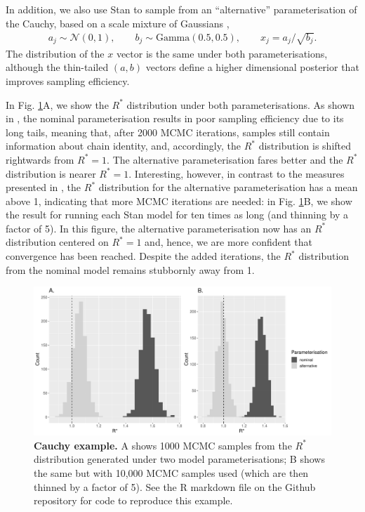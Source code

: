 \documentclass{article}
\newcommand{\N}{\mathcal{N}}
\begin{document}
In addition, we also use Stan to sample from an ``alternative'' parameterisation of the Cauchy, based on a scale mixture of Gaussians \cite{vehtari2019rank},
%
\begin{align}
a_j \sim  \N(0,1), \qquad
b_j \sim  \text{Gamma}(0.5, 0.5), \qquad
x_j =  a_j/\sqrt{b_j}.
\end{align}
%
The distribution of the $x$ vector is the same under both parameterisations, although the thin-tailed $(a,b)$ vectors define a higher dimensional posterior that improves sampling efficiency.

In Fig. \ref{fig:cauchy}A, we show the $R^*$ distribution under both parameterisations. As shown in \cite{vehtari2019rank}, the nominal parameterisation results in poor sampling efficiency due to its long tails, meaning that, after 2000 MCMC iterations, samples still contain information about chain identity, and, accordingly, the $R^*$ distribution is shifted rightwards from $R^*=1$. The alternative parameterisation fares better and the $R^*$ distribution is nearer $R^*=1$. Interesting, however, in contrast to the measures presented in \cite{vehtari2019rank}, the $R^*$ distribution for the alternative parameterisation has a mean above 1, indicating that more MCMC iterations are needed: in Fig. \ref{fig:cauchy}B, we show the result for running each Stan model for ten times as long (and thinning by a factor of 5). In this figure, the alternative parameterisation now has an $R^*$ distribution centered on $R^*=1$ and, hence, we are more confident that convergence has been reached. Despite the added iterations, the $R^*$ distribution from the nominal model remains stubbornly away from 1.

\begin{figure}[h]
	\centerline{\includegraphics[width=1.0\textwidth]{../output/cauchy.pdf}}
	\caption{\textbf{Cauchy example.} A shows 1000 MCMC samples from the $R^*$ distribution generated under two model parameterisations; B shows the same but with 10,000 MCMC samples used (which are then thinned by a factor of 5). See the R markdown file on the Github repository for code to reproduce this example.}
	\label{fig:cauchy}
\end{figure}
\end{document}
